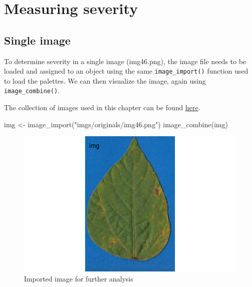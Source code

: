 \documentclass[
  letterpaper,
  DIV=11,
  numbers=noendperiod]{scrreprt}
\newenvironment{Shaded}{\begin{snugshade}}{\end{snugshade}}
\newcommand{\FunctionTok}[1]{\textcolor[rgb]{0.28,0.35,0.67}{#1}}
\newcommand{\NormalTok}[1]{\textcolor[rgb]{0.00,0.23,0.31}{#1}}
\newcommand{\OtherTok}[1]{\textcolor[rgb]{0.00,0.23,0.31}{#1}}
\newcommand{\StringTok}[1]{\textcolor[rgb]{0.13,0.47,0.30}{#1}}
\begin{document}
\hypertarget{measuring-severity-1}{%
\section{Measuring severity}\label{measuring-severity-1}}

\hypertarget{single-image}{%
\subsection{Single image}\label{single-image}}

To determine severity in a single image (img46.png), the image file
needs to be loaded and assigned to an object using the same
\texttt{image\_import()} function used to load the palettes. We can then
visualize the image, again using \texttt{image\_combine()}.

\begin{tcolorbox}[enhanced jigsaw, colbacktitle=quarto-callout-tip-color!10!white, toprule=.15mm, leftrule=.75mm, bottomrule=.15mm, opacitybacktitle=0.6, coltitle=black, rightrule=.15mm, left=2mm, breakable, colframe=quarto-callout-tip-color-frame, title=\textcolor{quarto-callout-tip-color}{\faLightbulb}\hspace{0.5em}{Tip}, bottomtitle=1mm, toptitle=1mm, titlerule=0mm, colback=white, arc=.35mm, opacityback=0]
The collection of images used in this chapter can be found
\href{https://github.com/emdelponte/epidemiology-R/tree/main/imgs/originals}{here}.
\end{tcolorbox}

\begin{Shaded}
\begin{Highlighting}[]
\NormalTok{img }\OtherTok{\textless{}{-}} \FunctionTok{image\_import}\NormalTok{(}\StringTok{"imgs/originals/img46.png"}\NormalTok{)}
\FunctionTok{image\_combine}\NormalTok{(img)}
\end{Highlighting}
\end{Shaded}

\begin{figure}[H]

{\centering \includegraphics{./data-actual-severity_files/figure-pdf/fig-img-1.pdf}

}

\caption{\label{fig-img}Imported image for further analysis}

\end{figure}
\end{document}
